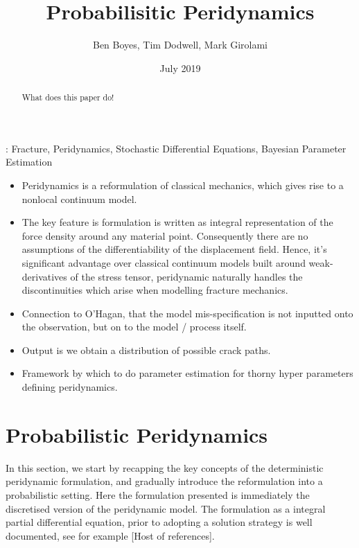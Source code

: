 \documentclass{article}
\title{Probabilisitic Peridynamics}
\author{Ben Boyes, Tim Dodwell, Mark Girolami}
\date{July 2019}
\begin{document}
\maketitle

\begin{abstract}
What does this paper do!
\end{abstract}
: Fracture, Peridynamics, Stochastic Differential Equations, Bayesian Parameter Estimation

\begin{itemize}

\section{Introduction}

\item Peridynamics is a reformulation of classical mechanics, which gives rise to a nonlocal continuum model.

\item The key feature is formulation is written as integral representation of the force density around any material point. Consequently there are no assumptions of the differentiability of the displacement field. Hence, it's significant advantage over classical continuum models built around weak-derivatives of the stress tensor, peridynamic naturally handles the discontinuities which arise when modelling fracture mechanics.

\item Connection to O'Hagan, that the model mis-specification is not inputted onto the observation, but on to the model / process itself.

\item Output is we obtain a distribution of possible crack paths.

\item Framework by which to do parameter estimation for thorny hyper parameters defining peridynamics.

\end{itemize}



\section{Probabilistic Peridynamics}

In this section, we start by recapping the key concepts of the deterministic peridynamic formulation, and gradually introduce the reformulation into a probabilistic setting. Here the formulation presented is immediately the discretised version of the peridynamic model. The formulation as a integral partial differential equation, prior to adopting a solution strategy is well documented, see for example [Host of references].
\end{document}
